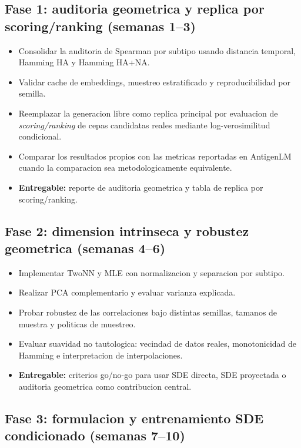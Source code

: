 \documentclass[12pt,letterpaper]{article}
\begin{document}
\subsection*{Fase 1: auditoria geometrica y replica por scoring/ranking \texorpdfstring{(semanas 1--3)}{(semanas 1--3)}}

\begin{itemize}[leftmargin=2em]
    \item Consolidar la auditoria de Spearman por subtipo usando distancia temporal, Hamming HA y Hamming HA+NA.
    \item Validar cache de embeddings, muestreo estratificado y reproducibilidad por semilla.
    \item Reemplazar la generacion libre como replica principal por evaluacion de \emph{scoring/ranking} de cepas candidatas reales mediante log-verosimilitud condicional.
    \item Comparar los resultados propios con las metricas reportadas en AntigenLM cuando la comparacion sea metodologicamente equivalente.
    \item \textbf{Entregable:} reporte de auditoria geometrica y tabla de replica por scoring/ranking.
\end{itemize}

\subsection*{Fase 2: dimension intrinseca y robustez geometrica \texorpdfstring{(semanas 4--6)}{(semanas 4--6)}}

\begin{itemize}[leftmargin=2em]
    \item Implementar TwoNN y MLE con normalizacion y separacion por subtipo.
    \item Realizar PCA complementario y evaluar varianza explicada.
    \item Probar robustez de las correlaciones bajo distintas semillas, tamanos de muestra y politicas de muestreo.
    \item Evaluar suavidad no tautologica: vecindad de datos reales, monotonicidad de Hamming e interpretacion de interpolaciones.
    \item \textbf{Entregable:} criterios go/no-go para usar SDE directa, SDE proyectada o auditoria geometrica como contribucion central.
\end{itemize}

\subsection*{Fase 3: formulacion y entrenamiento SDE condicionado \texorpdfstring{(semanas 7--10)}{(semanas 7--10)}}
\end{document}
